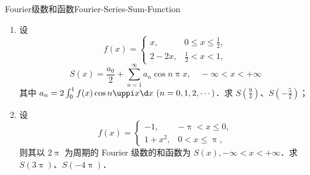\begin{problem}{Fourier级数和函数}{Fourier-Series-Sum-Function}
    \begin{enumerate}
        \item 设
              \begin{equation}
                  f(x) = \begin{cases} x, & 0 \leqslant x \leqslant \frac{1}{2}, \\ 2 - 2x, & \frac{1}{2} < x < 1, \end{cases}
              \end{equation}
              \begin{equation}
                  S(x) = \frac{a_0}{2} + \sum_{n=1}^{\infty} a_n \cos n \uppi x, \quad -\infty < x < +\infty
              \end{equation}
              其中 $a_n = 2 \int_{0}^{1} f(x) \cos n \uppi x \d x \ (n = 0, 1, 2, \cdots)$．求 $S\left(\frac{9}{4}\right)$、$S\left(-\frac{5}{2}\right)$；
        \item 设
              \begin{equation}
                  f(x) = \begin{cases} -1, & -\uppi < x \leqslant 0, \\ 1 + x^2, & 0 < x \leqslant \uppi, \end{cases}
              \end{equation}
              则其以 $2\uppi$ 为周期的 Fourier 级数的和函数为 $S(x), -\infty < x < +\infty$．求 $S(3\uppi)$、$S(-4\uppi)$．
    \end{enumerate}
\end{problem}

